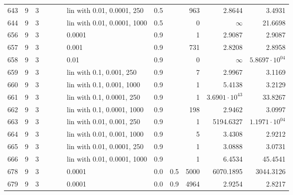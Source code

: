 \begin{longtable}{lrrrrrlrrrrr}
 643 &       9 & 3 &   &   &   &  lin with 0.01, 0.0001, 250 &  0.5 &        &     963 &                 2.8644 &                 3.4931 \\
 644 &       9 & 3 &   &   &   & lin with 0.01, 0.0001, 1000 &  0.5 &        &       0 &               $\infty$ &                21.6698 \\
 656 &       9 & 3 &   &   &   &                      0.0001 &  0.9 &        &       1 &                 2.9087 &                 2.9087 \\
 657 &       9 & 3 &   &   &   &                       0.001 &  0.9 &        &     731 &                 2.8208 &                 2.8958 \\
 658 &       9 & 3 &   &   &   &                        0.01 &  0.9 &        &       0 &               $\infty$ &  $5.8697\cdot 10^{04}$ \\
 659 &       9 & 3 &   &   &   &    lin with 0.1, 0.001, 250 &  0.9 &        &       7 &                 2.9967 &                 3.1169 \\
 660 &       9 & 3 &   &   &   &   lin with 0.1, 0.001, 1000 &  0.9 &        &       1 &                 5.4138 &                 3.2129 \\
 661 &       9 & 3 &   &   &   &   lin with 0.1, 0.0001, 250 &  0.9 &        &       1 &  $3.6901\cdot 10^{43}$ &                33.8267 \\
 662 &       9 & 3 &   &   &   &  lin with 0.1, 0.0001, 1000 &  0.9 &        &     198 &                 2.9462 &                 3.0997 \\
 663 &       9 & 3 &   &   &   &   lin with 0.01, 0.001, 250 &  0.9 &        &       1 &              5194.6327 &  $1.1971\cdot 10^{04}$ \\
 664 &       9 & 3 &   &   &   &  lin with 0.01, 0.001, 1000 &  0.9 &        &       5 &                 3.4308 &                 2.9212 \\
 665 &       9 & 3 &   &   &   &  lin with 0.01, 0.0001, 250 &  0.9 &        &       1 &                 3.0888 &                 3.0731 \\
 666 &       9 & 3 &   &   &   & lin with 0.01, 0.0001, 1000 &  0.9 &        &       1 &                 6.4534 &                45.4541 \\
 678 &       9 & 3 &   &   &   &                      0.0001 &  0.0 &    0.5 &    5000 &              6070.1895 &              3044.3126 \\
 679 &       9 & 3 &   &   &   &                      0.0001 &  0.0 &    0.9 &    4964 &                 2.9254 &                 2.8217 \\

\end{longtable}
